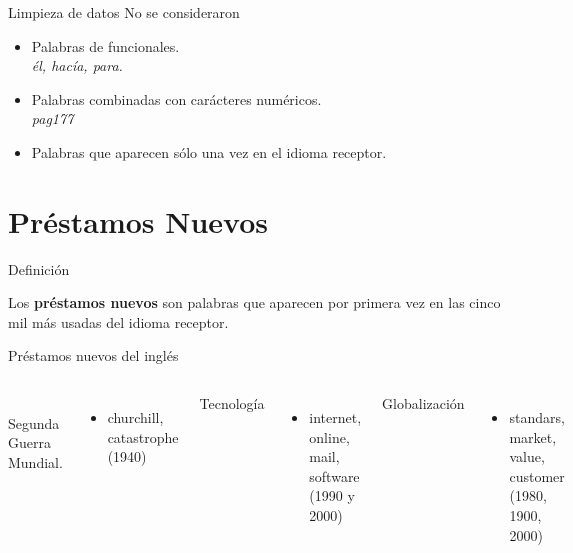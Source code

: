 \documentclass[10pt,xcolor={usenames,dvipsnames}]{beamer}
\begin{document}
\begin{frame}[fragile]{Limpieza de datos}
	No se consideraron 
	\begin{itemize}
		\item<2->[$\blacksquare$] Palabras de funcionales.
		\\ 
		\centering\textcolor{Sepia}{\textit{él, hacía, para.}}
		\\
		\item<3->[$\blacksquare$] Palabras combinadas con carácteres numéricos.
		\\
		\centering\textcolor{Sepia}{\textit{pag177}}
		\\
		\item<4->[$\blacksquare$] Palabras que aparecen sólo una vez en el idioma receptor.
	\end{itemize}
	
\end{frame}

\section{Préstamos Nuevos}


\begin{frame}[fragile]{Definición}
	
	Los \textbf{préstamos nuevos} son palabras que aparecen por primera vez en las cinco mil más usadas del idioma receptor.
	
\end{frame}

\begin{frame}{Préstamos nuevos del inglés }
		\begin{columns}
			\\
			\textcolor{Sepia}{Segunda Guerra Mundial.}
			\begin{itemize}
				\item churchill, catastrophe (1940)  
			\end{itemize} 
			
			\textcolor{Sepia}{Tecnología}
			\begin{itemize}
				\item internet, online, mail, software (1990 y 2000)
			\end{itemize}
			
			\textcolor{Sepia}{Globalización}
			\begin{itemize}
				\item standars, market, value, customer (1980, 1900, 2000)
			\end{itemize}
			
		\end{columns}
	
\end{frame}
\end{document}
